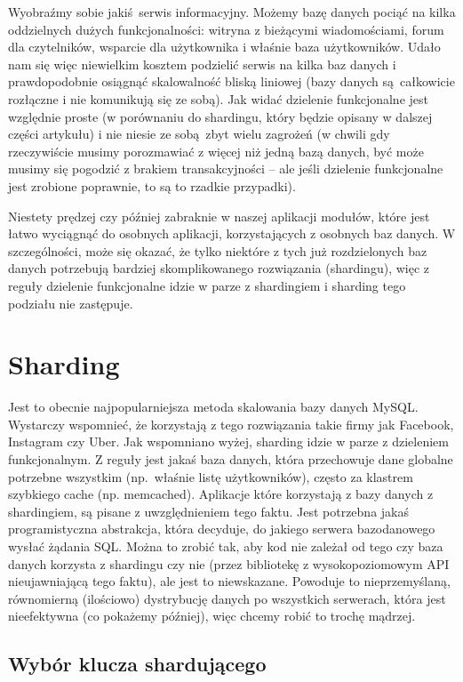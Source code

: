 \documentclass[a4paper,12pt]{article}
\begin{document}
Wyobraźmy sobie jakiś serwis informacyjny. Możemy bazę danych pociąć na kilka oddzielnych dużych funkcjonalności: witryna z bieżącymi wiadomościami, forum dla czytelników, wsparcie dla użytkownika i właśnie baza użytkowników. Udało nam się więc niewielkim kosztem podzielić serwis na kilka baz danych i prawdopodobnie osiągnąć skalowalność bliską liniowej (bazy danych są całkowicie rozłączne i nie komunikują się ze sobą). Jak widać dzielenie funkcjonalne jest względnie proste (w porównaniu do shardingu, który będzie opisany w dalszej części artykułu) i nie niesie ze sobą zbyt wielu zagrożeń (w chwili gdy rzeczywiście musimy porozmawiać z więcej niż jedną bazą danych, być może musimy się pogodzić z brakiem transakcyjności – ale jeśli dzielenie funkcjonalne jest zrobione poprawnie, to są to rzadkie przypadki).

Niestety prędzej czy później zabraknie w naszej aplikacji modułów, które jest łatwo wyciągnąć do osobnych aplikacji, korzystających z osobnych baz danych. W szczególności, może się okazać, że tylko niektóre z tych już rozdzielonych baz danych potrzebują bardziej skomplikowanego rozwiązania (shardingu), więc z reguły dzielenie funkcjonalne idzie w parze z shardingiem i sharding tego podziału nie zastępuje.

\section{Sharding}

Jest to obecnie najpopularniejsza metoda skalowania bazy danych MySQL. Wystarczy wspomnieć, że korzystają z tego rozwiązania takie firmy jak Facebook, Instagram czy Uber. Jak wspomniano wyżej, sharding idzie w parze z dzieleniem funkcjonalnym. Z reguły jest jakaś baza danych, która przechowuje dane globalne potrzebne wszystkim (np.~właśnie listę użytkowników), często za klastrem szybkiego cache (np. memcached). Aplikacje które korzystają z bazy danych z shardingiem, są pisane z uwzględnieniem tego faktu. Jest potrzebna jakaś programistyczna abstrakcja, która decyduje, do jakiego serwera bazodanowego wysłać żądania SQL. Można to zrobić tak, aby kod nie zależał od tego czy baza danych korzysta z shardingu czy nie (przez bibliotekę z wysokopoziomowym API nieujawniającą tego faktu), ale jest to niewskazane. Powoduje to nieprzemyślaną, równomierną (ilościowo) dystrybucję danych po wszystkich serwerach, która jest nieefektywna (co pokażemy później), więc chcemy robić to trochę mądrzej.

\subsection{Wybór klucza shardującego}
\end{document}
